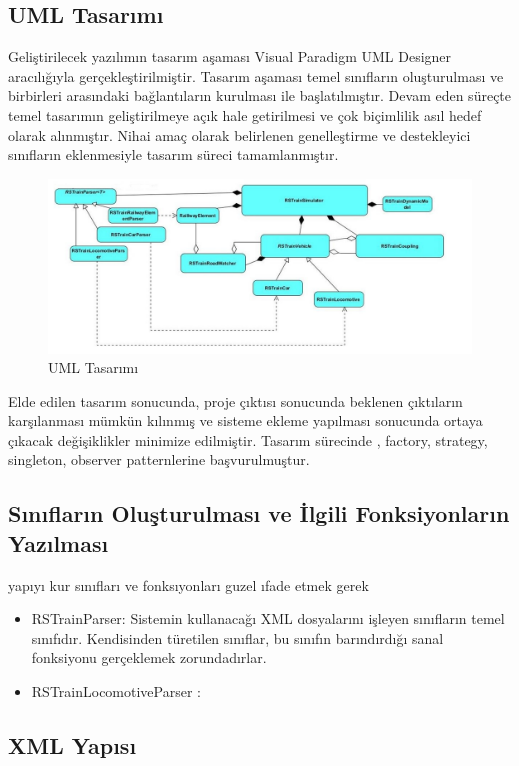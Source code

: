 \documentclass[10pt,a4paper]{article}
\begin{document}
\subsection{UML Tasarımı}
Geliştirilecek yazılımın tasarım aşaması Visual Paradigm UML Designer aracılığıyla gerçekleştirilmiştir. Tasarım aşaması temel sınıfların oluşturulması ve birbirleri arasındaki bağlantıların kurulması ile başlatılmıştır. Devam eden süreçte temel tasarımın geliştirilmeye açık hale getirilmesi ve çok biçimlilik asıl hedef olarak alınmıştır. Nihai amaç olarak belirlenen genelleştirme ve destekleyici sınıfların eklenmesiyle tasarım süreci tamamlanmıştır. 

\begin{figure}[h]
\shorthandoff{=}
\centering
\caption{UML Tasarımı}
\label{image:uml}
\includegraphics[scale=0.5]{resimler/uml.jpg} 
\end{figure}

Elde edilen tasarım sonucunda, proje çıktısı sonucunda beklenen çıktıların karşılanması mümkün kılınmış ve sisteme ekleme yapılması sonucunda ortaya çıkacak değişiklikler minimize edilmiştir. Tasarım sürecinde , factory, strategy, singleton, observer patternlerine başvurulmuştur.

\subsection{Sınıfların Oluşturulması ve İlgili Fonksiyonların Yazılması}
yapıyı kur sınıfları ve fonksıyonları guzel ıfade etmek gerek
\begin{itemize}
\item RSTrainParser: Sistemin kullanacağı XML dosyalarını işleyen sınıfların temel sınıfıdır. Kendisinden türetilen sınıflar, bu sınıfın barındırdığı sanal fonksiyonu gerçeklemek zorundadırlar. 
\item RSTrainLocomotiveParser :
\end{itemize}

\subsection{XML Yapısı}
\end{document}
